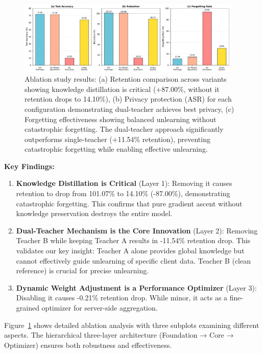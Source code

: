 \documentclass[10pt,twocolumn]{article}
\begin{document}
\begin{figure}[t]
\centering
\includegraphics[width=0.95\textwidth]{figures/figure2_ablation_study.pdf}
\caption{Ablation study results: (a) Retention comparison across variants showing knowledge distillation is critical (+87.00\%, without it retention drops to 14.10\%), (b) Privacy protection (ASR) for each configuration demonstrating dual-teacher achieves best privacy, (c) Forgetting effectiveness showing balanced unlearning without catastrophic forgetting. The dual-teacher approach significantly outperforms single-teacher (+11.54\% retention), preventing catastrophic forgetting while enabling effective unlearning.}
\label{fig:ablation}
\end{figure}

\textbf{Key Findings:}

\begin{enumerate}
\item \textbf{Knowledge Distillation is Critical} (Layer 1): Removing it causes retention to drop from 101.07\% to 14.10\% (-87.00\%), demonstrating catastrophic forgetting. This confirms that pure gradient ascent without knowledge preservation destroys the entire model.
\item \textbf{Dual-Teacher Mechanism is the Core Innovation} (Layer 2): Removing Teacher B while keeping Teacher A results in -11.54\% retention drop. This validates our key insight: Teacher A alone provides global knowledge but cannot effectively guide unlearning of specific client data. Teacher B (clean reference) is crucial for precise unlearning.
\item \textbf{Dynamic Weight Adjustment is a Performance Optimizer} (Layer 3): Disabling it causes -0.21\% retention drop. While minor, it acts as a fine-grained optimizer for server-side aggregation.
\end{enumerate}

Figure~\ref{fig:ablation} shows detailed ablation analysis with three subplots examining different aspects. The hierarchical three-layer architecture (Foundation → Core → Optimizer) ensures both robustness and effectiveness.
\end{document}
